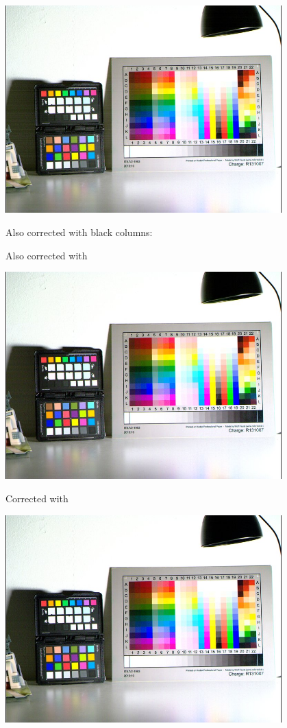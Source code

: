 \begin{center}
\includegraphics[height=8cm]{images/10ms+4-no-blackcol-small}
\end{center}

Also corrected with black columns: 

\begin{center}
\end{center}

Also corrected with  

\begin{center}
\includegraphics[height=8cm]{images/10ms+4-fixrn-small}
\end{center}

Corrected with 

\begin{center}
\includegraphics[height=8cm]{images/10ms+4-rnfilter2-small}
\end{center}

